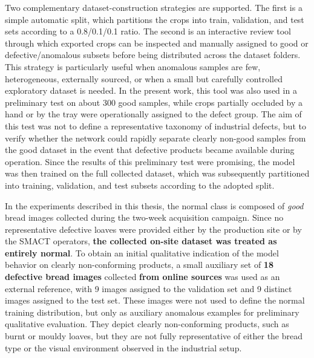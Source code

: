 Two complementary dataset-construction strategies are supported. The first is a simple automatic split, which partitions the crops into train, validation, and test sets according to a 0.8/0.1/0.1 ratio. The second is an interactive review tool through which exported crops can be inspected and manually assigned to good or defective/anomalous subsets before being distributed across the dataset folders.\cite{labby_thesis_repo_2026} This strategy is particularly useful when anomalous samples are few, heterogeneous, externally sourced, or when a small but carefully controlled exploratory dataset is needed. In the present work, this tool was also used in a preliminary test on about 300 good samples, while crops partially occluded by a hand or by the tray were operationally assigned to the defect group. The aim of this test was not to define a representative taxonomy of industrial defects, but to verify whether the network could rapidly separate clearly non-good samples from the good dataset in the event that defective products became available during operation. Since the results of this preliminary test were promising, the model was then trained on the full collected dataset, which was subsequently partitioned into training, validation, and test subsets according to the adopted split.

In the experiments described in this thesis, the normal class is composed of \emph{good} bread images collected during the two-week acquisition campaign. Since no representative defective loaves were provided either by the production site or by the SMACT \cite{smact_official_2026} operators, \textbf{the collected on-site dataset was treated as entirely normal}. To obtain an initial qualitative indication of the model behavior on clearly non-conforming products, a small auxiliary set of \textbf{18 defective bread images} collected \textbf{from online sources} was used as an external reference, with 9 images assigned to the validation set and 9 distinct images assigned to the test set. These images were not used to define the normal training distribution, but only as auxiliary anomalous examples for preliminary qualitative evaluation. They depict clearly non-conforming products, such as burnt or mouldy loaves, but they are not fully representative of either the bread type or the visual environment observed in the industrial setup.

